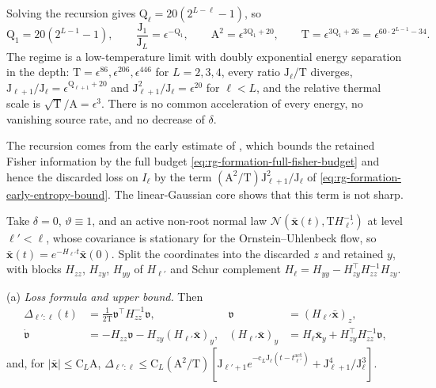 Solving the recursion gives \(\mathrm Q_\ell=20(2^{L-\ell}-1)\), so
\begin{equation}
\mathrm Q_1=20(2^{L-1}-1),\qquad
\frac{\mathrm J_1}{\mathrm J_L}=\epsilon^{-\mathrm Q_1},\qquad
\mathrm A^2=\epsilon^{3\mathrm Q_1+20},\qquad
\mathrm T=\epsilon^{3\mathrm Q_1+26}=\epsilon^{60\cdot2^{L-1}-34}.
\label{eq:rg-formation-regime-closed-form}
\end{equation}
The regime is a low-temperature limit with doubly exponential energy
separation in the depth: \(\mathrm T=\epsilon^{86},\epsilon^{206},
\epsilon^{446}\) for \(L=2,3,4\), every ratio \(\mathrm J_\ell/\mathrm T\)
diverges, \(\mathrm J_{\ell+1}/\mathrm J_\ell=\epsilon^{\mathrm Q_{\ell+1}+20}\)
and \(\mathrm J_{\ell+1}^2/\mathrm J_\ell=\epsilon^{20}\) for \(\ell<L\), and
the relative thermal scale is \(\sqrt{\mathrm T}/\mathrm A=\epsilon^3\). There
is no common acceleration of every energy, no vanishing source rate, and no
decrease of \(\delta\). 

The recursion comes from the early estimate of
, which bounds the retained Fisher
information by the full budget \cref{eq:rg-formation-full-fisher-budget} and
hence the discarded loss on \(I_\ell\) by the term
\((\mathrm A^2/\mathrm T)\mathrm J_{\ell+1}^2/\mathrm J_\ell\) of
\cref{eq:rg-formation-early-entropy-bound}. The linear-Gaussian core shows
that this term is not sharp.

Take \(\delta=0\), \(\vartheta\equiv1\), and an active non-root normal law
\(\mathcal N(\bar{\mathbf x}(t),\mathrm TH_{\ell'}^{-1})\) at level
\(\ell'<\ell\), whose covariance is stationary for the Ornstein--Uhlenbeck
flow, so \(\bar{\mathbf x}(t)=e^{-H_{\ell'}t}\bar{\mathbf x}(0)\). Split the
coordinates into the discarded \(z\) and retained \(y\), with blocks
\(H_{zz}\), \(H_{zy}\), \(H_{yy}\) of \(H_{\ell'}\) and Schur complement
\(H_\ell=H_{yy}-H_{zy}^\top H_{zz}^{-1}H_{zy}\).

(a) \emph{Loss formula and upper bound.} Then
\begin{equation}
\begin{aligned}
\Delta_{\ell':\ell}(t)&=\frac1{2\mathrm T}\mathfrak v^\top H_{zz}^{-1}\mathfrak v,
&
\mathfrak v&=(H_{\ell'}\bar{\mathbf x})_z,\\
\dot{\mathfrak v}&=-H_{zz}\mathfrak v-H_{zy}(H_{\ell'}\bar{\mathbf x})_y,
&
(H_{\ell'}\bar{\mathbf x})_y&=H_\ell\bar{\mathbf x}_y+H_{zy}^\top H_{zz}^{-1}\mathfrak v,
\end{aligned}
\label{eq:rg-formation-gaussian-core-loss}
\end{equation}
and, for \(|\bar{\mathbf x}|\le\mathrm C_L\mathrm A\),
\(\Delta_{\ell':\ell}\le\mathrm C_L(\mathrm A^2/\mathrm T)
[\mathrm J_{\ell'+1}e^{-\mathrm c_L\mathrm J_\ell(t-t^{\mathrm{act}}_{\ell'})}
+\mathrm J_{\ell+1}^4/\mathrm J_\ell^3]\).

